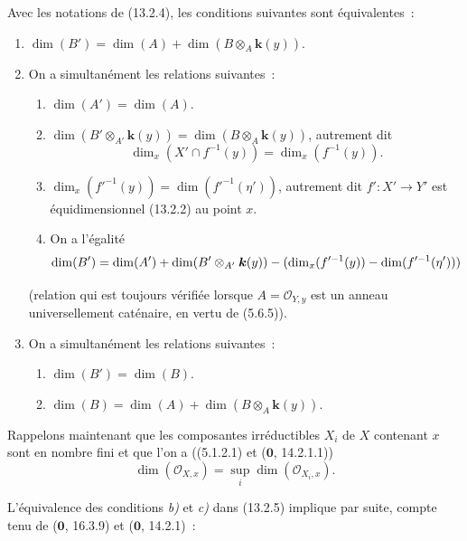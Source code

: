 \begin{lemma}[13.2.5]
\label{IV.13.2.5-fr}
Avec les notations de \textup{(13.2.4)}, les conditions suivantes sont équivalentes~:
\begin{enumerate}[label=\emph{\alph*)}]
  \item $\dim(B')=\dim(A)+\dim(B\otimes_A\boldsymbol{k}(y))$.
  \item On a simultanément les relations suivantes~:
  \begin{enumerate}[label=\textup{(\roman*)}]
    \item $\dim(A')=\dim(A)$.
    \item $\dim(B'\otimes_{A'}\boldsymbol{k}(y))=\dim(B\otimes_A\boldsymbol{k}(y))$, autrement dit
    \[
      \dim_x(X'\cap f^{-1}(y))=\dim_x(f^{-1}(y)).
    \]
    \item $\dim_x(f'^{-1}(y))=\dim(f'^{-1}(\eta'))$, autrement dit
    $f':X'\to Y'$ est équidimensionnel \textup{(13.2.2)} au point $x$.
    \item On a l'égalité
    \[
      \dim(B')=\dim(A')+\dim(B'\otimes_{A'}\boldsymbol{k}(y))
      -(\dim_x(f'^{-1}(y))-\dim(f'^{-1}(\eta')))
    \]
  \end{enumerate}
  (relation qui est toujours vérifiée lorsque $A=\mathcal O_{Y,y}$ est un
  anneau universellement caténaire, en vertu de \textup{(5.6.5)}).
  \item On a simultanément les relations suivantes~:
  \begin{enumerate}[label=\textup{(\roman*)}]
    \item $\dim(B')=\dim(B)$.
    \item $\dim(B)=\dim(A)+\dim(B\otimes_A\boldsymbol{k}(y))$.
  \end{enumerate}
\end{enumerate}
\end{lemma}

\begin{env}[13.2.6]
\label{IV.13.2.6-fr}
Rappelons maintenant que les composantes irréductibles $X_i$ de $X$ contenant
$x$ sont en nombre fini et que l'on a ((5.1.2.1) et ($\mathbf 0$, 14.2.1.1))
\[
\tag{13.2.6.1}
\label{IV.13.2.6.1-fr}
  \dim(\mathcal O_{X,x})=\sup_i\dim(\mathcal O_{X_i,x}).
\]

L'équivalence des conditions \emph{b)} et \emph{c)} dans (13.2.5) implique par suite,
compte tenu de ($\mathbf 0$, 16.3.9) et ($\mathbf 0$, 14.2.1)~:
\end{env}

